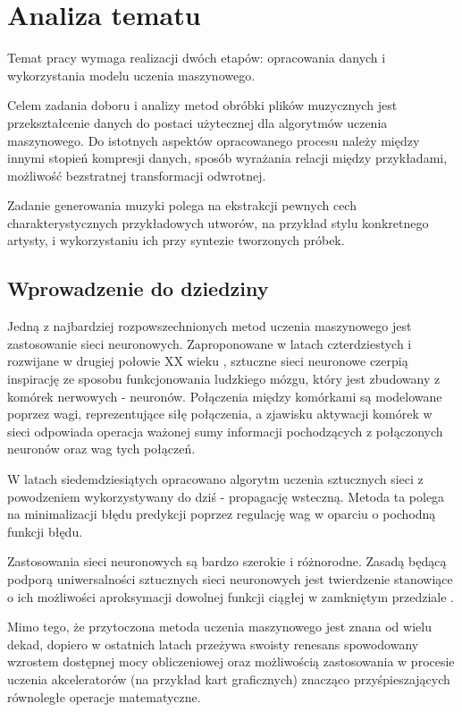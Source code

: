\chapter{Analiza tematu}\label{chap:analysis}
{
  Temat pracy wymaga realizacji dwóch etapów: opracowania danych i\,\,wykorzystania modelu
  uczenia maszynowego.

  Celem zadania doboru i\,\,analizy metod obróbki plików muzycznych jest 
  przekształcenie danych do postaci użytecznej dla algorytmów uczenia maszynowego.
  Do istotnych aspektów opracowanego procesu należy między innymi stopień kompresji danych,
  sposób wyrażania relacji między przykładami, możliwość bezstratnej transformacji odwrotnej. 

  Zadanie generowania muzyki polega na ekstrakcji pewnych cech charakterystycznych
  przykładowych utworów, na przykład stylu konkretnego artysty, 
  i\,\,wykorzystaniu ich przy syntezie tworzonych próbek. 

  \section{Wprowadzenie do dziedziny}
  {
    Jedną z\,\,najbardziej rozpowszechnionych metod uczenia maszynowego jest zastosowanie sieci neuronowych.
    Zaproponowane w\,\,latach czterdziestych i\,\,rozwijane w\,\,drugiej połowie XX wieku \cite{McCulloch1943}, sztuczne sieci neuronowe
    czerpią inspirację ze sposobu funkcjonowania ludzkiego mózgu, który jest zbudowany z\,\,komórek nerwowych - neuronów.
    Połączenia między komórkami są modelowane poprzez wagi, reprezentujące siłę połączenia, a\,\,zjawisku aktywacji
    komórek w\,\,sieci odpowiada operacja ważonej sumy informacji pochodzących z\,\,połączonych neuronów oraz wag tych połączeń.
    
    W\,\,latach siedemdziesiątych opracowano algorytm uczenia sztucznych sieci z\,\,powodzeniem wykorzystywany
    do dziś - propagację wsteczną. Metoda ta polega na minimalizacji błędu predykcji poprzez regulację
    wag w\,\,oparciu o\,\,pochodną funkcji błędu.

    Zastosowania sieci neuronowych są bardzo szerokie i\,\,różnorodne. Zasadą będącą podporą uniwersalności 
    sztucznych sieci neuronowych jest twierdzenie stanowiące o\,\,ich możliwości aproksymacji dowolnej 
    funkcji ciągłej w\,\,zamkniętym przedziale \cite{Csji2001ApproximationWA}.

    Mimo tego, że przytoczona metoda uczenia maszynowego jest znana od wielu dekad, dopiero w\,\,ostatnich latach
    przeżywa swoisty renesans spowodowany wzrostem dostępnej mocy obliczeniowej oraz 
    możliwością zastosowania w\,\,procesie uczenia akceleratorów (na przykład kart graficznych) znacząco 
    przyśpieszających równoległe operacje matematyczne.


}}
